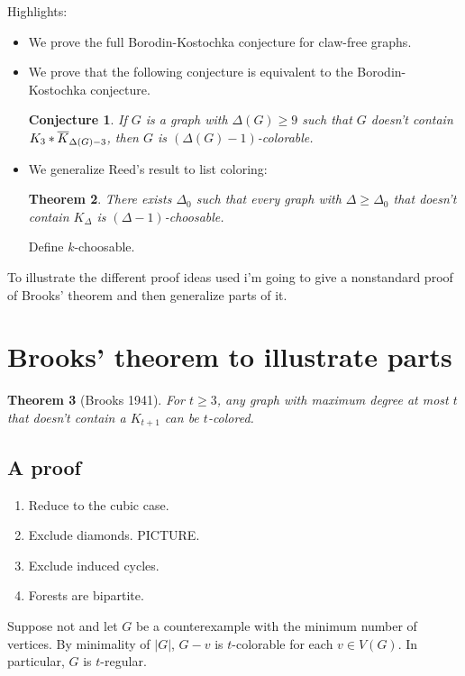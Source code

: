 \documentclass[12pt]{article}
\theoremstyle{plain}
\newtheorem{thm}{Theorem}[section]
\newtheorem{conjecture}[thm]{Conjecture}
\theoremstyle{definition}
\theoremstyle{remark}
\newcommand{\card}[1]{\left|#1\right|}
\newcommand{\join}[2]{#1 \mbox{\hspace{2 pt}$\ast$\hspace{2 pt}} #2}
\begin{document}
\noindent Highlights:
\begin{itemize}
\item We prove the full Borodin-Kostochka conjecture for claw-free graphs.
\item We prove that the following conjecture is equivalent to the Borodin-Kostochka conjecture.
\begin{conjecture}
If $G$ is a graph with $\Delta(G) \geq 9$ such that $G$ doesn't contain $\join{K_3}{\overline{K}_{\Delta(G)-3}}$, then $G$ is $(\Delta(G)-1)$-colorable.
\end{conjecture}
\item We generalize Reed's result to list coloring:

\begin{thm}
There exists $\Delta_0$ such that every graph with $\Delta \geq \Delta_0$ that doesn't contain $K_{\Delta}$ is $(\Delta-1)$-choosable.
\end{thm}

Define $k$-choosable.
\end{itemize}

To illustrate the different proof ideas used i'm going to give a nonstandard proof of Brooks' theorem and then generalize parts of it.

\section{Brooks' theorem to illustrate parts}
\begin{thm}[Brooks 1941]
For $t \geq 3$, any graph with maximum degree at most $t$ that doesn't contain a $K_{t + 1}$ can be $t$-colored.
\end{thm}

\subsection{A proof}
\begin{enumerate}
\item Reduce to the cubic case.
\item Exclude diamonds.  PICTURE.
\item Exclude induced cycles.
\item Forests are bipartite.
\end{enumerate}

Suppose not and let $G$ be a counterexample with the minimum number of vertices.  By minimality of $\card{G}$, $G-v$ is $t$-colorable for each $v \in V(G)$.  In particular, $G$ is $t$-regular.
\end{document}

